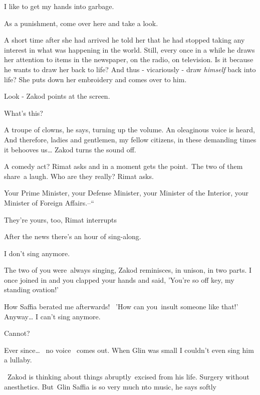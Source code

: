 \documentclass[letterpaper]{article}
\begin{document}
{\textquotedbl}I like to get my hands into garbage.{\textquotedbl} 

{\textquotedbl}As a punishment, come over here and take a look.{\textquotedbl}

A short time after she had arrived he told her that he had stopped taking any interest in what was happening in the
world. Still, every once in a while he draws her attention to items in the newspaper, on the radio, on television. Is
it because he wants to draw her back to life? And thus - vicariously - draw \textit{himself} back into life? She puts
down her embroidery and comes over to him. 

{\textquotedbl}Look -{\textquotedbl} Zakod points at the screen. 

{\textquotedbl}What's this?{\textquotedbl} 

{\textquotedbl}A troupe of clowns,{\textquotedbl} he says, turning up the volume. An oleaginous voice is heard,
{\textquotedbl}And therefore, ladies and gentlemen, my fellow citizens, in these demanding times it behooves
us{\dots}{\textquotedbl} Zakod turns the sound off. 

{\textquotedbl}A comedy act?{\textquotedbl} Rimat asks and in a moment gets the point.~The two of them share~a laugh.
{\textquotedbl}Who are they really?{\textquotedbl} Rimat asks. 

{\textquotedbl}Your Prime Minister, your Defense Minister, your Minister of the Interior, your Minister of Foreign
Affairs.--``

{\textquotedbl}They're yours, too,{\textquotedbl} Rimat interrupts 

{\textquotedbl}After the news there's an hour of sing-along.{\textquotedbl} 

{\textquotedbl}I don't sing anymore.{\textquotedbl} 

{\textquotedbl}The two of you were~always singing,{\textquotedbl} Zakod reminisces, {\textquotedbl}in unison, in two
parts. I once joined in and you clapped your hands and said, 'You're so off key, my standing ovation!'{\textquotedbl} 

{\textquotedbl}How Saffia berated me afterwards! \ {}'How can you~insult someone like that!' Anyway{\dots} I can't sing
anymore.{\textquotedbl} 

{\textquotedbl}Cannot?{\textquotedbl} 

{\textquotedbl}Ever since{\dots} ~no voice ~comes out. When Glin was small I couldn't even sing him a
lullaby.{\textquotedbl} 

~Zakod is thinking about things abruptly~excised from his life. Surgery without anesthetics. {\textquotedbl}But~Glin
Saffia is so very much nto music,{\textquotedbl} he says softly
\end{document}

